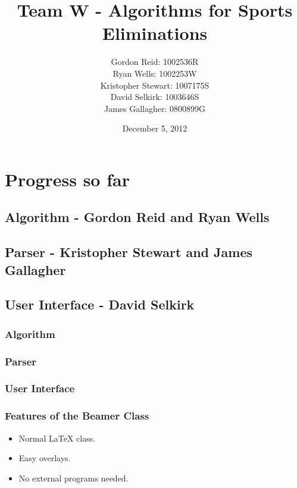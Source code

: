 \documentclass{beamer}
\title{Team W - Algorithms for Sports Eliminations}
\author{
    Gordon Reid: 1002536R\\
    Ryan Wells: 1002253W\\
    Kristopher Stewart: 1007175S\\
    David Selkirk: 1003646S\\
    James Gallagher: 0800899G\\
}
\date{December 5, 2012}
\begin{document}
\frame{\titlepage}

\section[Outline]{}
\frame{\tableofcontents}

\section{Progress so far}
\subsection{Algorithm - Gordon Reid and Ryan Wells}
\subsection{Parser - Kristopher Stewart and James Gallagher}
\subsection{User Interface - David Selkirk}
\frame
{
	\frametitle{Algorithm}
}
\frame
{
	\frametitle{Parser}
}
\frame
{
	\frametitle{User Interface}
}

\frame
{
  \frametitle{Features of the Beamer Class}

  \begin{itemize}
  \item Normal LaTeX class.
  \item Easy overlays.
  \item<2-> No external programs needed.      
  \end{itemize}
}
\end{document}
